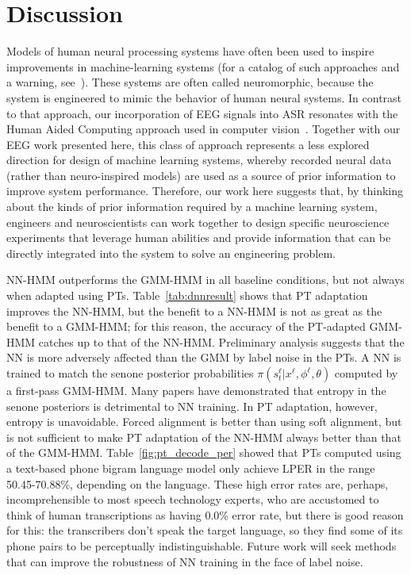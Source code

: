 \section{Discussion}

Models of human neural processing systems have often been used to
inspire improvements in machine-learning systems (for a catalog of
such approaches and a warning, see~\cite{Bourlard96}).  These systems
are often called neuromorphic, because the system is engineered to
mimic the behavior of human neural systems. In contrast to that
approach, our incorporation of EEG signals into ASR resonates with the
Human Aided Computing approach used in computer
vision~\cite{Shenoy08,Wang09}. Together with our EEG work presented
here, this class of approach represents a less explored direction for
design of machine learning systems, whereby recorded neural data
(rather than neuro-inspired models) are used as a source of prior
information to improve system performance. Therefore, our work here
suggests that, by thinking about the kinds of prior information
required by a machine learning system, engineers and neuroscientists
can work together to design specific neuroscience experiments that
leverage human abilities and provide information that can be directly
integrated into the system to solve an engineering problem.

NN-HMM outperforms the GMM-HMM in all baseline conditions, but not
always when adapted using PTs. Table~\ref{tab:dnnresult}
shows that PT adaptation improves the NN-HMM, but the benefit to a
NN-HMM is not as great as the benefit to a GMM-HMM; for this reason,
the accuracy of the PT-adapted GMM-HMM catches up to that of the
NN-HMM.  Preliminary analysis suggests that the NN is more
adversely affected than the GMM by label noise in the PTs.  A NN is
trained to match the senone posterior probabilities
$\pi(s_t^\ell|x^\ell,\phi^\ell,\theta)$ computed by a first-pass
GMM-HMM.  Many papers have demonstrated that entropy in the senone
posteriors is detrimental to NN training.
In PT adaptation, however, entropy is unavoidable. 
Forced alignment is better than using soft alignment, but is not
sufficient to make PT adaptation of the NN-HMM always better than
that of the GMM-HMM.  Table~\ref{fig:pt_decode_per} showed that PTs
computed using a text-based phone bigram language model only achieve
LPER in the range 50.45-70.88\%, depending on the language.  These
high error rates are, perhaps, incomprehensible to most speech
technology experts, who are accustomed to think of human
transcriptions as having 0.0\% error rate, but there is good reason
for this: the transcribers don't speak the target language, so they
find some of its phone pairs to be perceptually indistinguishable.
Future work will seek methods that can improve the robustness of NN
training in the face of label noise.

